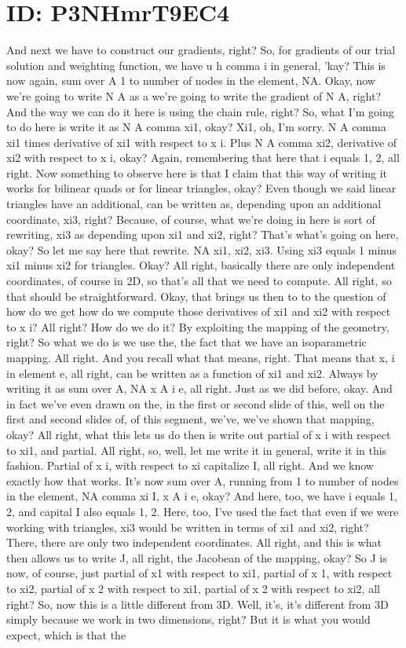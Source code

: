 \documentclass[10pt]{article}
\begin{document}
\section*{ID: P3NHmrT9EC4}
And next we have to construct our gradients, right? So, for gradients of our trial solution and weighting function, we have u h comma i in general, 'kay? This is now again, sum over A 1 to number of nodes in the element, NA. Okay, now we're going to write N A as a we're going to write the gradient of N A, right? And the way we can do it here is using the chain rule, right? So, what I'm going to do here is write it as N A comma xi1, okay? Xi1, oh, I'm sorry. N A comma xi1 times derivative of xi1 with respect to x i. Plus N A comma xi2, derivative of xi2 with respect to x i, okay? Again, remembering that here that i equals 1, 2, all right. Now something to observe here is that I claim that this way of writing it works for bilinear quads or for linear triangles, okay? Even though we said linear triangles have an additional, can be written as, depending upon an additional coordinate, xi3, right? Because, of course, what we're doing in here is sort of rewriting, xi3 as depending upon xi1 and xi2, right? That's what's going on here, okay? So let me say here that rewrite. NA xi1, xi2, xi3. Using xi3 equals 1 minus xi1 minus xi2 for triangles. Okay? All right, basically there are only independent coordinates, of course in 2D, so that's all that we need to compute. All right, so that should be straightforward. Okay, that brings us then to to the question of how do we get how do we compute those derivatives of xi1 and xi2 with respect to x i? All right? How do we do it? By exploiting the mapping of the geometry, right? So what we do is we use the, the fact that we have an isoparametric mapping. All right. And you recall what that means, right. That means that x, i in element e, all right, can be written as a function of xi1 and xi2. Always by writing it as sum over A, NA x A i e, all right. Just as we did before, okay. And in fact we've even drawn on the, in the first or second slide of this, well on the first and second slides of, of this segment, we've, we've shown that mapping, okay? All right, what this lets us do then is write out partial of x i with respect to xi1, and partial. All right, so, well, let me write it in general, write it in this fashion. Partial of x i, with respect to xi capitalize I, all right. And we know exactly how that works. It's now sum over A, running from 1 to number of nodes in the element, NA comma xi I, x A i e, okay? And here, too, we have i equals 1, 2, and capital I also equals 1, 2. Here, too, I've used the fact that even if we were working with triangles, xi3 would be written in terms of xi1 and xi2, right? There, there are only two independent coordinates. All right, and this is what then allows us to write J, all right, the Jacobean of the mapping, okay? So J is now, of course, just partial of x1 with respect to xi1, partial of x 1, with respect to xi2, partial of x 2 with respect to xi1, partial of x 2 with respect to xi2, all right? So, now this is a little different from 3D. Well, it's, it's different from 3D simply because we work in two dimensions, right? But it is what you would expect, which is that the 
\end{document}
